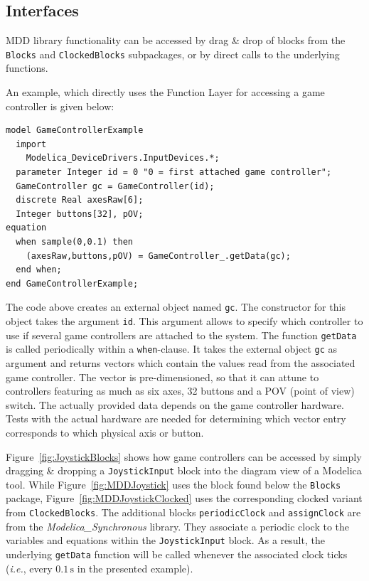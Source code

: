 \documentclass{resources/modelica}
\newcommand{\modelica}[1]{\lstinline[language=modelica]|#1|}
\begin{document}
\subsection{Interfaces}

MDD library functionality can be accessed by drag \& drop of blocks
from the \modelica{Blocks} and \modelica{ClockedBlocks} subpackages, or by
direct calls to the underlying functions.

An example, which directly uses the \textsf{Function Layer} for accessing a
game controller is given below:
\begin{lstlisting}[language=modelica]
model GameControllerExample
  import
    Modelica_DeviceDrivers.InputDevices.*;
  parameter Integer id = 0 "0 = first attached game controller";
  GameController gc = GameController(id);
  discrete Real axesRaw[6];
  Integer buttons[32], pOV;
equation
  when sample(0,0.1) then
    (axesRaw,buttons,pOV) = GameController_.getData(gc);
  end when;
end GameControllerExample;
\end{lstlisting}

The code above creates an external object named \mbox{\modelica{gc}.} The
constructor for this object takes the argument \mbox{\modelica{id}.} This
argument allows to specify which controller to use if several game controllers are attached to the
system. The function \modelica{getData} is called periodically within a
\modelica{when}-clause. It takes the external object \modelica{gc} as
argument and returns vectors which contain the values read from the
associated game controller. The vector is pre-dimensioned, so that it can attune
to controllers featuring as much as six axes, 32 buttons and a POV (point of
view) switch. The actually provided data depends on the game
controller hardware. Tests with the actual hardware are needed for determining
which vector entry corresponds to which physical axis or button.

Figure~\ref{fig:JoystickBlocks} shows how game controllers can be accessed by
simply dragging \& dropping a \modelica{JoystickInput} block into the diagram
view of a Modelica tool. While Figure~\ref{fig:MDDJoystick} uses the block found
below the \modelica{Blocks} package,
Figure~\ref{fig:MDDJoystickClocked} uses the corresponding clocked variant from
\modelica{ClockedBlocks}. The additional blocks \modelica{periodicClock} and
\modelica{assignClock} are from the \emph{Modelica\_Synchronous} library. They
associate a periodic clock to the variables and equations within the
\modelica{JoystickInput} block. As a result, the underlying
\modelica{getData} function will be called whenever the
associated clock ticks (\textit{i.e.}, every $0.1\,\mathrm{s}$ in the presented
example).
\end{document}
